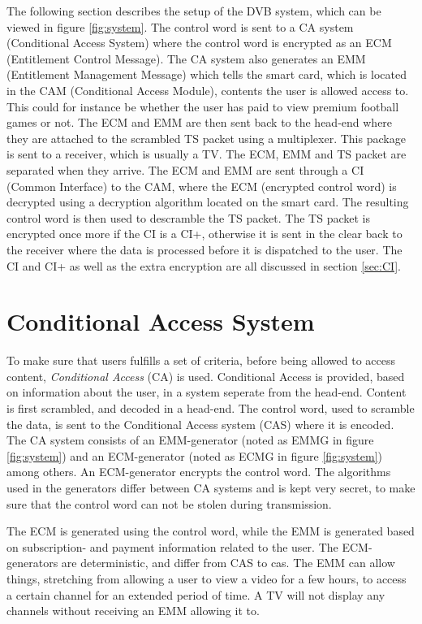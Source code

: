 The following section describes the setup of the DVB system, which can 
be viewed in figure \ref{fig:system}. The control word is sent to a 
CA system (Conditional Access System) where the control word is 
encrypted as an ECM (Entitlement Control Message). The CA system also 
generates an EMM (Entitlement Management Message) which tells the 
smart card, which is located in the CAM (Conditional Access Module), 
contents the user is allowed access to. This could for instance be 
whether the user has paid to view premium football games or not. The 
ECM and EMM are then sent back to the head-end where they are attached 
to the scrambled TS packet using a multiplexer. This package is sent 
to a receiver, which is usually a TV. The ECM, EMM and TS packet are 
separated when they arrive. The ECM and EMM are sent through a 
CI (Common Interface) to the CAM, where the ECM (encrypted control 
word) is decrypted using a decryption algorithm located on the smart 
card. The resulting control word is then used to descramble the TS 
packet. The TS packet is encrypted once more if the CI is a CI+, 
otherwise it is sent in the clear back to the receiver where the data 
is processed before it is dispatched to the user. The CI and CI+ 
as well as the extra encryption are all discussed in section 
\ref{sec:CI}.

\section{Conditional Access System} \label{sec:CAS}
To make sure that users fulfills a set of criteria, before being 
allowed to access content, \emph{Conditional Access} (CA) is used. 
Conditional Access is provided, based on information about the user, 
in a system seperate from the head-end. Content is first scrambled, 
and decoded in a head-end. The control word, used to scramble the 
data, is sent to the Conditional Access system (CAS) where it is 
encoded. The CA system consists of an EMM-generator (noted as EMMG in 
figure \ref{fig:system}) and an ECM-generator (noted as ECMG in figure 
\ref{fig:system}) among others. An ECM-generator encrypts the control 
word. The algorithms used in the generators differ between CA systems 
and is kept very secret, to make sure that the control word can not be 
stolen during transmission.

The ECM is generated using the control word, while the EMM is 
generated based on subscription- and payment information related to 
the user. The ECM-generators are deterministic, and differ from CAS to 
cas. The EMM can allow things, stretching from allowing a user to 
view a video for a few hours, to access a certain channel for an 
extended period of time. A TV will not display any channels without 
receiving an EMM allowing it to.

